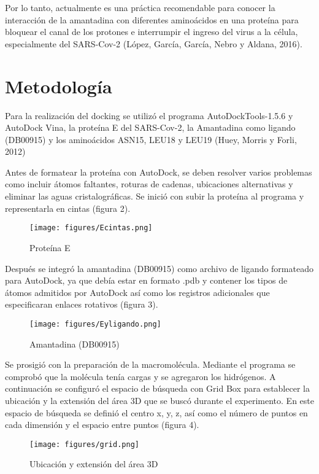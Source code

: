 \documentclass[12pt]{article}
\begin{document}
Por lo tanto, actualmente es una práctica recomendable para conocer la interacción de la amantadina con diferentes aminoácidos en una proteína para bloquear el canal de los protones e interrumpir el ingreso del virus a la célula, especialmente del SARS-Cov-2 (López, García, García, Nebro y Aldana, 2016).  

	
	\section{Metodología}
	\label{sec:metodologia}
	
Para la realización del docking se utilizó el programa AutoDockTools-1.5.6 y AutoDock Vina, la proteína E del SARS-Cov-2, la Amantadina como ligando (DB00915) y los aminoácidos ASN15, LEU18 y LEU19 (Huey, Morris y Forli, 2012) 

Antes de formatear la proteína con AutoDock, se deben resolver varios problemas como incluir átomos faltantes, roturas de cadenas, ubicaciones alternativas y eliminar las aguas cristalográficas. Se inició con subir la proteína al programa y representarla en cintas (figura 2). 


 \begin{figure}[!ht]
 \centering
 \texttt{[image: figures/Ecintas.png]}
 \caption{Proteína E}
 \label{fig:exemplo}
\end{figure}
	
	
Después se integró la amantadina (DB00915) como archivo de ligando formateado para AutoDock, ya que debía estar en formato .pdb y contener los tipos de átomos admitidos por AutoDock así como los registros adicionales que especificaran enlaces rotativos (figura 3). 


\begin{figure}[!ht]
 \centering
 \texttt{[image: figures/Eyligando.png]}
 \caption{Amantadina (DB00915)}
 \label{fig:exemplo}
\end{figure}
	
	
Se prosigió con la preparación de la macromolécula. Mediante el programa se comprobó que la molécula tenía cargas y se agregaron los hidrógenos. A continuación se configuró el espacio de búsqueda con Grid Box para establecer la ubicación y la extensión del área 3D que se buscó durante el experimento. En este espacio de búsqueda se definió el centro x, y, z, así como el número de puntos en cada dimensión y el espacio entre puntos (figura 4). 
	
	
\begin{figure}[!ht]
 \centering
 \texttt{[image: figures/grid.png]}
 \caption{Ubicación y extensión del área 3D}
 \label{fig:exemplo}
\end{figure}
	
\end{document}
